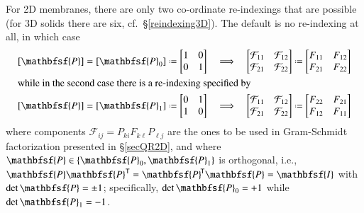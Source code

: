 For 2D membranes, there are only two co-ordinate re-indexings that are possible (for 3D solids there are six, cf.\ \S\ref{reindexing3D}).  The default is no re-indexing at all, in which case 
\begin{subequations}
	\label{membraneRelabling}
	\begin{align}
	[ \mathbfsf{P} ] = [ \mathbfsf{P}_0 ] & \defeq 
	\begin{bmatrix} 1 & 0 \\ 0 & 1 \end{bmatrix} & 
	\implies & & \begin{bmatrix}
	\mathcal{F}_{11} & \mathcal{F}_{12} \\
	\mathcal{F}_{21} & \mathcal{F}_{22}
	\end{bmatrix} & \defeq \begin{bmatrix}
	F_{11} & F_{12} \\
	F_{21} & F_{22}
	\end{bmatrix} \label{Q0} \\
	\intertext{while in the second case there is a re-indexing specified by}
	[ \mathbfsf{P} ] = [ \mathbfsf{P}_1 ] & \defeq 
	\begin{bmatrix} 0 & 1 \\ 1 & 0 \end{bmatrix} & 
	\implies & & \begin{bmatrix}
	\mathcal{F}_{11} & \mathcal{F}_{12} \\
	\mathcal{F}_{21} & \mathcal{F}_{22}
	\end{bmatrix} & \defeq \begin{bmatrix}
	F_{22} & F_{21} \\
	F_{12} & F_{11}
	\end{bmatrix}
	\label{Q1}
	\end{align}
\end{subequations}
where components $\mathcal{F}_{ij} = P_{ki} F_{k\ell} P_{\ell j}$ are the ones to be used in Gram-Schmidt factorization presented in \S\ref{secQR2D}, and where $\mathbfsf{P} \in \{ \mathbfsf{P}_0 , \mathbfsf{P}_1 \}$ is orthogonal, i.e., $\mathbfsf{P} \mathbfsf{P}^{\mathsf{T}} = \mathbfsf{P}^{\hspace{-1pt}\mathsf{T}} \mathbfsf{P} = \mathbfsf{I}$ with $\det \mathbfsf{P} = \pm 1$; specifically, $\det \mathbfsf{P}_0 = +1$ while $\det \mathbfsf{P}_1 = -1$.

